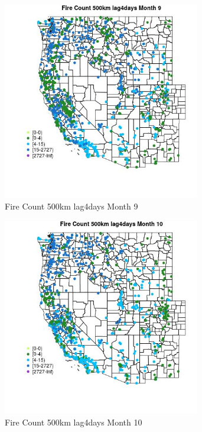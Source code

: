 \begin{figure} 
\centering  
\includegraphics[width=0.77\textwidth]{Code_Outputs/Report_ML_input_PM25_Step4_part_f_de_duplicated_aveswNAs_MapObsMo9Fire_Count_500km_lag4days.jpg} 
\caption{\label{fig:Report_ML_input_PM25_Step4_part_f_de_duplicated_aveswNAsMapObsMo9Fire_Count_500km_lag4days}Fire Count 500km lag4days Month 9} 
\end{figure} 
 

\clearpage 

\begin{figure} 
\centering  
\includegraphics[width=0.77\textwidth]{Code_Outputs/Report_ML_input_PM25_Step4_part_f_de_duplicated_aveswNAs_MapObsMo10Fire_Count_500km_lag4days.jpg} 
\caption{\label{fig:Report_ML_input_PM25_Step4_part_f_de_duplicated_aveswNAsMapObsMo10Fire_Count_500km_lag4days}Fire Count 500km lag4days Month 10} 
\end{figure} 
 


